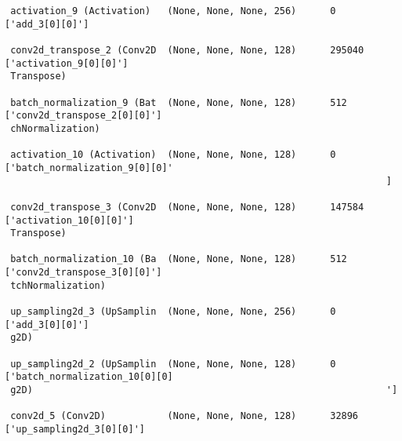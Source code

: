 \documentclass[
  letterpaper,
  DIV=11,
  numbers=noendperiod]{scrreprt}
\begin{document}
\begin{verbatim}
 activation_9 (Activation)   (None, None, None, 256)      0         ['add_3[0][0]']               
                                                                                                  
 conv2d_transpose_2 (Conv2D  (None, None, None, 128)      295040    ['activation_9[0][0]']        
 Transpose)                                                                                       
                                                                                                  
 batch_normalization_9 (Bat  (None, None, None, 128)      512       ['conv2d_transpose_2[0][0]']  
 chNormalization)                                                                                 
                                                                                                  
 activation_10 (Activation)  (None, None, None, 128)      0         ['batch_normalization_9[0][0]'
                                                                    ]                             
                                                                                                  
 conv2d_transpose_3 (Conv2D  (None, None, None, 128)      147584    ['activation_10[0][0]']       
 Transpose)                                                                                       
                                                                                                  
 batch_normalization_10 (Ba  (None, None, None, 128)      512       ['conv2d_transpose_3[0][0]']  
 tchNormalization)                                                                                
                                                                                                  
 up_sampling2d_3 (UpSamplin  (None, None, None, 256)      0         ['add_3[0][0]']               
 g2D)                                                                                             
                                                                                                  
 up_sampling2d_2 (UpSamplin  (None, None, None, 128)      0         ['batch_normalization_10[0][0]
 g2D)                                                               ']                            
                                                                                                  
 conv2d_5 (Conv2D)           (None, None, None, 128)      32896     ['up_sampling2d_3[0][0]']     
                                                                                                  

\end{verbatim}
\end{document}
